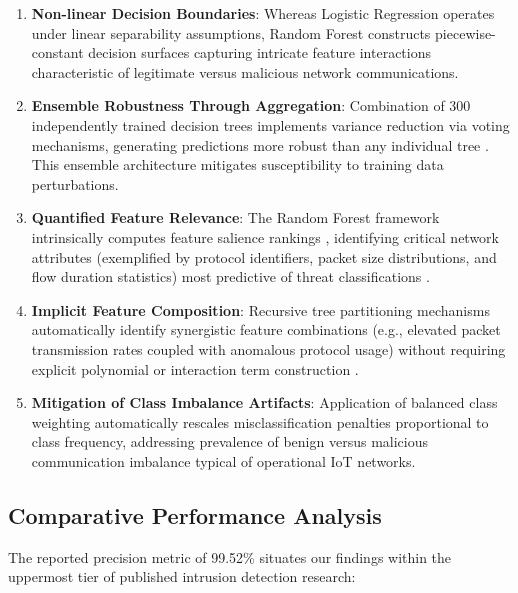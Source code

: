 \documentclass[conference]{IEEEtran}
\begin{document}
\begin{enumerate}
\item \textbf{Non-linear Decision Boundaries}: Whereas Logistic Regression \cite{b20} operates under linear separability assumptions, Random Forest constructs piecewise-constant decision surfaces capturing intricate feature interactions \cite{b21} characteristic of legitimate versus malicious network communications.

\item \textbf{Ensemble Robustness Through Aggregation}: Combination of 300 independently trained decision trees \cite{b21} implements variance reduction via voting mechanisms, generating predictions more robust than any individual tree \cite{b10}. This ensemble architecture mitigates susceptibility to training data perturbations.

\item \textbf{Quantified Feature Relevance}: The Random Forest framework intrinsically computes feature salience rankings \cite{b21}, identifying critical network attributes (exemplified by protocol identifiers, packet size distributions, and flow duration statistics) most predictive of threat classifications \cite{b15}.

\item \textbf{Implicit Feature Composition}: Recursive tree partitioning mechanisms automatically identify synergistic feature combinations (e.g., elevated packet transmission rates coupled with anomalous protocol usage) without requiring explicit polynomial or interaction term construction \cite{b21}.

\item \textbf{Mitigation of Class Imbalance Artifacts}: Application of balanced class weighting automatically rescales misclassification penalties \cite{b22} proportional to class frequency, addressing prevalence of benign versus malicious communication imbalance \cite{b15} typical of operational IoT networks.
\end{enumerate}

\subsection{Comparative Performance Analysis}

The reported precision metric of 99.52\% situates our findings within the uppermost tier of published intrusion detection research:
\end{document}
